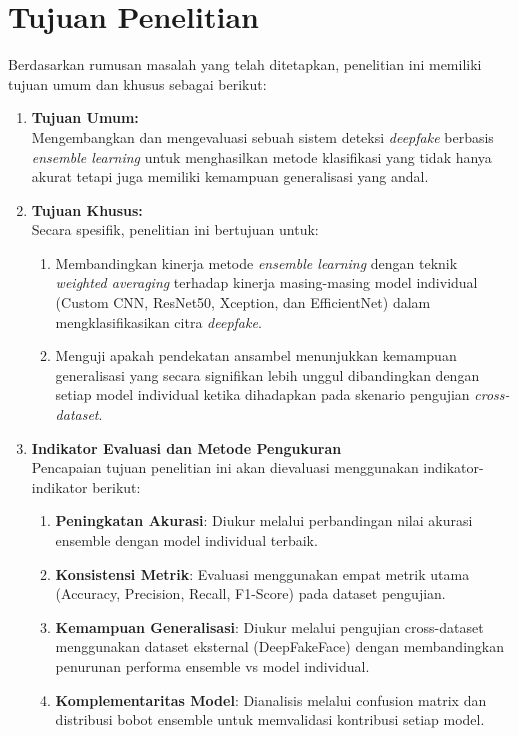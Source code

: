 \section{Tujuan Penelitian}

Berdasarkan rumusan masalah yang telah ditetapkan, penelitian ini memiliki tujuan umum dan khusus sebagai berikut:

\begin{enumerate}
\item \textbf{Tujuan Umum:} \\
Mengembangkan dan mengevaluasi sebuah sistem deteksi \textit{deepfake} berbasis \textit{ensemble learning} untuk menghasilkan metode klasifikasi yang tidak hanya akurat tetapi juga memiliki kemampuan generalisasi yang andal.

\item \textbf{Tujuan Khusus:} \\
Secara spesifik, penelitian ini bertujuan untuk:
\begin{enumerate}
    \item Membandingkan kinerja metode \textit{ensemble learning} dengan teknik \textit{weighted averaging} terhadap kinerja masing-masing model individual (Custom CNN, ResNet50, Xception, dan EfficientNet) dalam mengklasifikasikan citra \textit{deepfake}.
    
    \item Menguji apakah pendekatan ansambel menunjukkan kemampuan generalisasi yang secara signifikan lebih unggul dibandingkan dengan setiap model individual ketika dihadapkan pada skenario pengujian \textit{cross-dataset}.
\end{enumerate}

\item \textbf{Indikator Evaluasi dan Metode Pengukuran} \\
Pencapaian tujuan penelitian ini akan dievaluasi menggunakan indikator-indikator berikut:

\begin{enumerate}
    \item \textbf{Peningkatan Akurasi}: Diukur melalui perbandingan nilai akurasi ensemble dengan model individual terbaik.
    
    \item \textbf{Konsistensi Metrik}: Evaluasi menggunakan empat metrik utama (Accuracy, Precision, Recall, F1-Score) pada dataset pengujian.
    
    \item \textbf{Kemampuan Generalisasi}: Diukur melalui pengujian cross-dataset menggunakan dataset eksternal (DeepFakeFace) dengan membandingkan penurunan performa ensemble vs model individual.
    
    \item \textbf{Komplementaritas Model}: Dianalisis melalui confusion matrix dan distribusi bobot ensemble untuk memvalidasi kontribusi setiap model.
\end{enumerate}
\end{enumerate}

